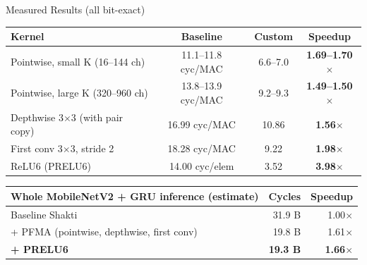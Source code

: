 \documentclass[aspectratio=169,11pt]{beamer}
\begin{document}
\begin{frame}{Measured Results (all bit-exact)}
  \centering\small
  \begin{tabular}{lccc}\toprule
    Kernel & Baseline & Custom & Speedup\\\midrule
    Pointwise, small K (16--144 ch) & 11.1--11.8 cyc/MAC & 6.6--7.0 & \textbf{1.69--1.70$\times$}\\
    Pointwise, large K (320--960 ch) & 13.8--13.9 cyc/MAC & 9.2--9.3 & \textbf{1.49--1.50$\times$}\\
    Depthwise 3$\times$3 (with pair copy) & 16.99 cyc/MAC & 10.86 & \textbf{1.56$\times$}\\
    First conv 3$\times$3, stride 2 & 18.28 cyc/MAC & 9.22 & \textbf{1.98$\times$}\\
    ReLU6 (PRELU6) & 14.00 cyc/elem & 3.52 & \textbf{3.98$\times$}\\\bottomrule
  \end{tabular}
  \vspace{4mm}
  \begin{tabular}{lrr}\toprule
    Whole MobileNetV2 + GRU inference (estimate) & Cycles & Speedup\\\midrule
    Baseline Shakti & 31.9 B & 1.00$\times$\\
    + PFMA (pointwise, depthwise, first conv) & 19.8 B & 1.61$\times$\\
    \textbf{+ PRELU6} & \textbf{19.3 B} & \textbf{1.66$\times$}\\\bottomrule
  \end{tabular}
\end{frame}



\end{document}
